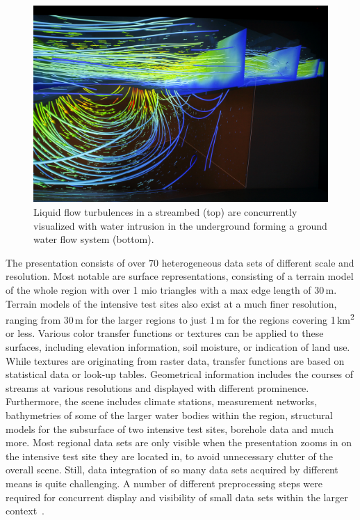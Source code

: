 \documentclass[twocolumn]{svjour3}          %
\begin{document}
\begin{figure}[htb]
  \includegraphics[width=\linewidth]{images/streambed.jpg}
\caption{Liquid flow turbulences in a streambed (top) are concurrently visualized with water intrusion in the underground forming a ground water flow system (bottom).}
\label{fig:streambed}
\end{figure}

The presentation consists of over $70$ heterogeneous data sets of different scale and resolution. Most notable are surface representations, consisting of a terrain model of the whole region with over 1 mio triangles with a max edge length of 30\,m. Terrain models of the intensive test sites also exist at a much finer resolution, ranging from 30\,m for the larger regions to just 1\,m for the regions covering 1\,km\textsuperscript{2} or less. Various color transfer functions or textures can be applied to these surfaces, including elevation information, soil moisture, or indication of land use. While textures are originating from raster data, transfer functions are based on statistical data or look-up tables. Geometrical information includes the courses of streams at various resolutions and displayed with different prominence. Furthermore, the scene includes climate stations, measurement networks, bathymetries of some of the larger water bodies within the region, structural models for the subsurface of two intensive test sites, borehole data and much more. Most regional data sets are only visible when the presentation zooms in on the intensive test site they are located in, to avoid unnecessary clutter of the overall scene. Still, data integration of so many data sets acquired by different means is quite challenging. A number of different preprocessing steps were required for concurrent display and visibility of small data sets within the larger context~\cite{rink:wessti, rink:eesenvirvis}.
\end{document}
